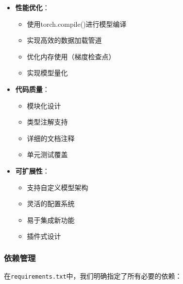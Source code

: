 \documentclass{ctexart}
\begin{document}
\begin{itemize}
    \item \textbf{性能优化}：
    \begin{itemize}
        \item 使用torch.compile()进行模型编译
        \item 实现高效的数据加载管道
        \item 优化内存使用（梯度检查点）
        \item 实现模型量化
    \end{itemize}
    
    \item \textbf{代码质量}：
    \begin{itemize}
        \item 模块化设计
        \item 类型注解支持
        \item 详细的文档注释
        \item 单元测试覆盖
    \end{itemize}
    
    \item \textbf{可扩展性}：
    \begin{itemize}
        \item 支持自定义模型架构
        \item 灵活的配置系统
        \item 易于集成新功能
        \item 插件式设计
    \end{itemize}
\end{itemize}

\subsubsection{依赖管理}
\noindent
在\texttt{requirements.txt}中，我们明确指定了所有必要的依赖：
\end{document}
